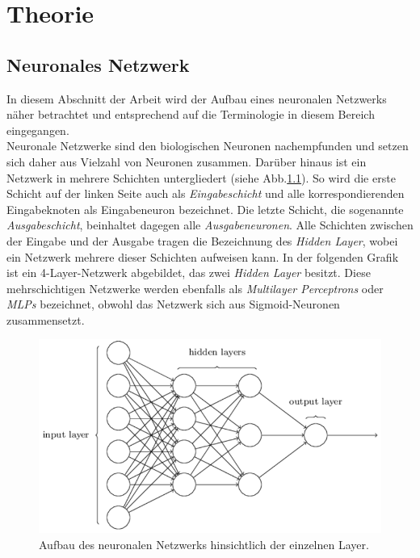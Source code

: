 \chapter{Theorie}

\section{Neuronales Netzwerk}
In diesem Abschnitt der Arbeit wird der Aufbau eines neuronalen Netzwerks näher betrachtet und entsprechend auf die Terminologie in diesem Bereich eingegangen. \\
Neuronale Netzwerke sind den biologischen Neuronen nachempfunden und setzen sich daher aus Vielzahl von Neuronen zusammen. Darüber hinaus ist ein Netzwerk in mehrere Schichten untergliedert (siehe Abb.\ref{fig:neural_network_extended}). So wird die erste Schicht auf der linken Seite auch als \textit{Eingabeschicht} und alle korrespondierenden Eingabeknoten als Eingabeneuron bezeichnet. Die letzte Schicht, die sogenannte \textit{Ausgabeschicht}, beinhaltet dagegen alle \textit{Ausgabeneuronen}. Alle Schichten zwischen der Eingabe und der Ausgabe tragen die Bezeichnung des \textit{Hidden Layer}, wobei ein Netzwerk mehrere dieser Schichten aufweisen kann. In der folgenden Grafik ist ein 4-Layer-Netzwerk abgebildet, das zwei \textit{Hidden Layer} besitzt. Diese mehrschichtigen Netzwerke werden ebenfalls als \textit{Multilayer Perceptrons} oder \textit{MLPs} bezeichnet, obwohl das Netzwerk sich aus Sigmoid-Neuronen zusammensetzt.
\begin{figure}[hbt]
	\centering
	\includegraphics[scale=0.6]{Bilder/neural_network_extended}
	\caption{Aufbau des neuronalen Netzwerks hinsichtlich der einzelnen Layer.} 
	\label{fig:neural_network_extended} 
\end{figure}

